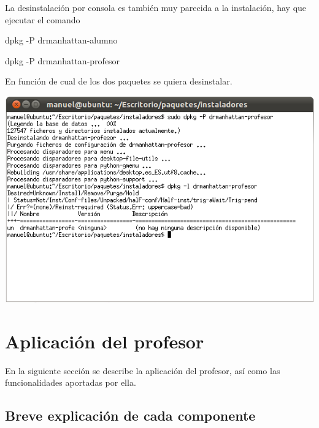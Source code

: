 \documentclass[11pt]{article}
\begin{document}
La desinstalación por consola es también muy parecida a la instalación, hay que ejecutar el comando

\begin{center}
    dpkg -P drmanhattan-alumno

    dpkg -P drmanhattan-profesor
\end{center}

En función de cual de los dos paquetes se quiera desinstalar.

\begin{center}

    \includegraphics[width=.90\linewidth]{imagenes/desConsola}

\end{center}

\newpage
\section{Aplicación del profesor}

En la siguiente sección se describe la aplicación del profesor, así como las funcionalidades aportadas por ella.

\subsection{Breve explicación de cada componente}
\end{document}
